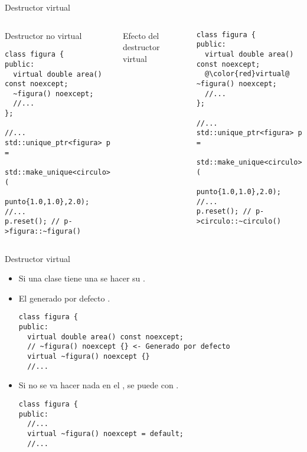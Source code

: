 \begin{frame}[t,fragile]{Destructor virtual}
\begin{columns}[T]

\begin{block}{Destructor no virtual}
\begin{lstlisting}
class figura {
public:
  virtual double area() const noexcept;
  ~figura() noexcept;
  //...
};

//...
std::unique_ptr<figura> p = 
    std::make_unique<circulo>(
        punto{1.0,1.0},2.0);
//...
p.reset(); // p->figura::~figura()
\end{lstlisting}
\end{block}

\begin{block}{Efecto del destructor virtual}
\end{block}
\begin{lstlisting}[escapechar=@]
class figura {
public:
  virtual double area() const noexcept;
  @\color{red}virtual@ ~figura() noexcept;
  //...
};

//...
std::unique_ptr<figura> p = 
    std::make_unique<circulo>(
        punto{1.0,1.0},2.0);
//...
p.reset(); // p->circulo::~circulo()
\end{lstlisting}

\end{columns}
\end{frame}


\begin{frame}[t,fragile]{Destructor virtual}
\begin{itemize}
  \item Si una clase tiene  una 
        se  hacer su .

  \item El  generado por defecto  .
\begin{lstlisting}
class figura {
public:
  virtual double area() const noexcept;
  // ~figura() noexcept {} <- Generado por defecto
  virtual ~figura() noexcept {}
  //...
\end{lstlisting}

  \item Si no se va hacer nada en el ,
        se puede  con .
\begin{lstlisting}
class figura {
public:
  //...
  virtual ~figura() noexcept = default;
  //...

\end{lstlisting}

\end{itemize}
\end{frame}


